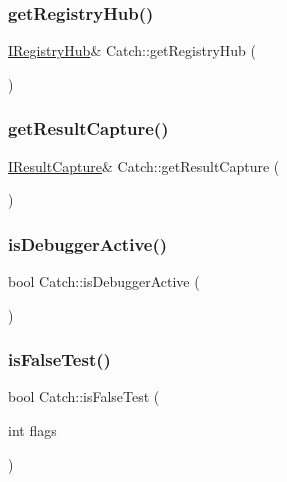 \subsubsection{\texorpdfstring{get\+Registry\+Hub()}{getRegistryHub()}}
{\footnotesize\ttfamily \hyperlink{struct_catch_1_1_i_registry_hub}{I\+Registry\+Hub}\& Catch\+::get\+Registry\+Hub (\begin{DoxyParamCaption}{ }\end{DoxyParamCaption})}

\mbox{\label{namespace_catch_aff60c1de6ac6cea30175d70e33d83c8e}} 
\subsubsection{\texorpdfstring{get\+Result\+Capture()}{getResultCapture()}}
{\footnotesize\ttfamily \hyperlink{struct_catch_1_1_i_result_capture}{I\+Result\+Capture}\& Catch\+::get\+Result\+Capture (\begin{DoxyParamCaption}{ }\end{DoxyParamCaption})}

\mbox{\label{namespace_catch_ab079497368fb1df25af39ad494d2a241}} 
\subsubsection{\texorpdfstring{is\+Debugger\+Active()}{isDebuggerActive()}}
{\footnotesize\ttfamily bool Catch\+::is\+Debugger\+Active (\begin{DoxyParamCaption}{ }\end{DoxyParamCaption})}

\mbox{\label{namespace_catch_a93ef4e3e307a2021ca0d41b32c0e54b0}} 
\subsubsection{\texorpdfstring{is\+False\+Test()}{isFalseTest()}}
{\footnotesize\ttfamily bool Catch\+::is\+False\+Test (\begin{DoxyParamCaption}\item[{int}]{flags }\end{DoxyParamCaption})\hspace{0.3cm}{\ttfamily [inline]}}

